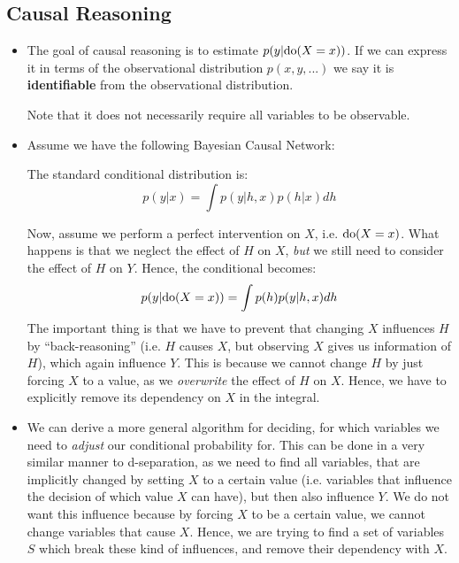\subsection{Causal Reasoning}
\begin{itemize}
	\item The goal of causal reasoning is to estimate $p(y|\textnormal{do}(X=x))$. If we can express it in terms of the observational distribution $p(x,y,...)$ we say it is \textbf{identifiable} from the observational distribution. 
	
	Note that it does not necessarily require all variables to be observable.
	\item Assume we have the following Bayesian Causal Network:
	
	\begin{figure}[ht!]
		\centering
	\end{figure}

	The standard conditional distribution is:
	$$p(y|x)=\int p(y|h,x)p(h|x)dh$$

	Now, assume we perform a perfect intervention on $X$, i.e. $\textnormal{do}(X=x)$. What happens is that we neglect the effect of $H$ on $X$, \textit{but} we still need to consider the effect of $H$ on $Y$. Hence, the conditional becomes:
	$$p(y|\textnormal{do}(X=x))=\int p(h)p(y|h,x)dh$$
	The important thing is that we have to prevent that changing $X$ influences $H$ by ``back-reasoning'' (i.e. $H$ causes $X$, but observing $X$ gives us information of $H$), which again influence $Y$. This is because we cannot change $H$ by just forcing $X$ to a value, as we \textit{overwrite} the effect of $H$ on $X$. Hence, we have to explicitly remove its dependency on $X$ in the integral.
	
	\item We can derive a more general algorithm for deciding, for which variables we need to \textit{adjust} our conditional probability for. This can be done in a very similar manner to d-separation, as we need to find all variables, that are implicitly changed by setting $X$ to a certain value (i.e. variables that influence the decision of which value $X$ can have), but then also influence $Y$. We do not want this influence because by forcing $X$ to be a certain value, we cannot change variables that cause $X$. Hence, we are trying to find a set of variables $S$ which break these kind of influences, and remove their dependency with $X$.
	

\end{itemize}
